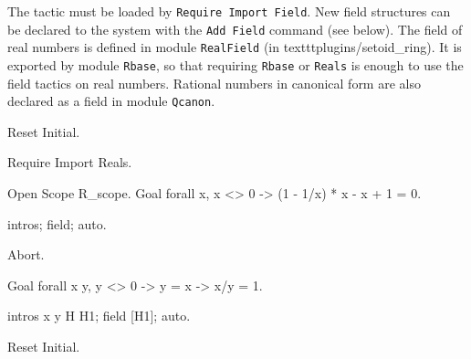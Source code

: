 The tactic must be loaded by \texttt{Require Import Field}. New field
structures can be declared to the system with the \texttt{Add Field}
command (see below). The field of real numbers is defined in module
\texttt{RealField} (in texttt{plugins/setoid\_ring}). It is exported
by module \texttt{Rbase}, so that requiring \texttt{Rbase} or
\texttt{Reals} is enough to use the field tactics on real
numbers. Rational numbers in canonical form are also declared as a
field in module \texttt{Qcanon}.


\Example
\begin{coq_eval}
Reset Initial.
\end{coq_eval}
\begin{coq_example*}
Require Import Reals.
\end{coq_example*}
\begin{coq_example}
Open Scope R_scope.
Goal forall x,  x <> 0 ->
   (1 - 1/x) * x - x + 1 = 0.
\end{coq_example}
\begin{coq_example}
intros; field; auto.
\end{coq_example}
\begin{coq_eval}
Abort.
\end{coq_eval}
\begin{coq_example}
Goal forall x y, y <> 0 -> y = x -> x/y = 1.
\end{coq_example}
\begin{coq_example}
intros x y H H1; field [H1]; auto.
\end{coq_example}
\begin{coq_eval}
Reset Initial.
\end{coq_eval}

